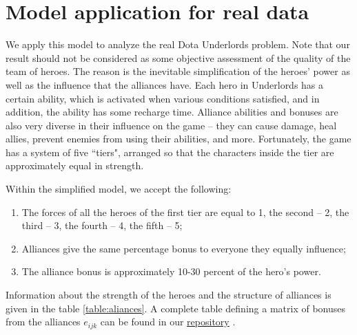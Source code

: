 \documentclass[smallextended]{svjour3}       %
\begin{document}
\section{Model application for real data}
\label{SectionComputationalResults}
  
We apply this model to analyze the real Dota Underlords problem. Note that our result should not be considered as some objective assessment of the quality of the team of heroes. The reason is the inevitable simplification of the heroes’ power as well as the influence that the alliances have. Each hero in Underlords has a certain ability, which is activated when various conditions satisfied, and in addition, the ability has some recharge time. Alliance abilities and bonuses are also very diverse in their influence on the game -- they can cause damage, heal allies, prevent enemies from using their abilities, and more. Fortunately, the game has a system of five ``tiers", arranged so that the characters inside the tier are approximately equal in strength.

Within the simplified model, we accept the following:
\begin{enumerate}
\item The forces of all the heroes of the first tier are equal to 1,  the second -- 2, the third -- 3, the fourth -- 4, the fifth -- 5;
\item Alliances give the same percentage bonus to everyone they equally influence;
\item The alliance bonus is approximately 10-30 percent of the hero’s power.
\end{enumerate}

Information about the strength of the heroes and the structure of alliances is given in the table \ref{table:aliances}. 
A complete table defining a matrix of bonuses from the alliances $e_{ijk} $ can be found in our \href{https://github.com/aponom84/UnderLords/blob/master/UnderLordsData.xlsx}{repository} \cite{UnderLordsInput}.
\end{document}
